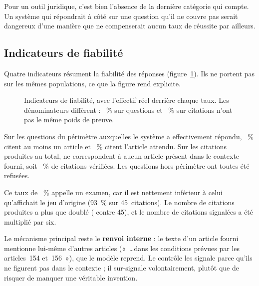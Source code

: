 Pour un outil juridique, c'est bien l'absence de la dernière catégorie qui compte. Un système qui
répondrait à côté sur une question qu'il ne couvre pas serait dangereux d'une manière que ne
compenserait aucun taux de réussite par ailleurs.

\subsection{Indicateurs de fiabilité}

Quatre indicateurs résument la fiabilité des réponses (figure~\ref{fig:fiabilite}). Ils ne portent
pas sur les mêmes populations, ce que la figure rend explicite.

\begin{figure}[htbp]
  \centering
  
  \caption[Indicateurs de fiabilité]{Indicateurs de fiabilité, avec l'effectif réel derrière
  chaque taux. Les dénominateurs diffèrent : \TauxAbstention~\% sur \NbOutScope{} questions et
  \TauxVerif~\% sur \NbCitations{} citations n'ont pas le même poids de preuve.}
  \label{fig:fiabilite}
\end{figure}

Sur les \NbRepondues{} questions du périmètre auxquelles le système a effectivement répondu,
\TauxCitation~\% citent au moins un article et \TauxSourceAttendue~\% citent l'article attendu.
Sur les \NbCitations{} citations produites au total, \NbNonVerifiees{} ne correspondent à aucun
article présent dans le contexte fourni, soit \TauxVerif~\% de citations vérifiées. Les
\NbOutScope{} questions hors périmètre ont toutes été refusées.

Ce taux de \TauxVerif~\% appelle un examen, car il est nettement inférieur à celui qu'affichait le
jeu d'origine (93~\% sur 45~citations). Le nombre de citations produites a plus que doublé
(\NbCitations{} contre 45), et le nombre de citations signalées a été multiplié par six.

Le mécanisme principal reste le \textbf{renvoi interne} : le texte d'un article fourni mentionne
lui-même d'autres articles («~\dots dans les conditions prévues par les articles~154 et~156~»),
que le modèle reprend. Le contrôle les signale parce qu'ils ne figurent pas dans le contexte ; il
sur-signale volontairement, plutôt que de risquer de manquer une véritable invention.

